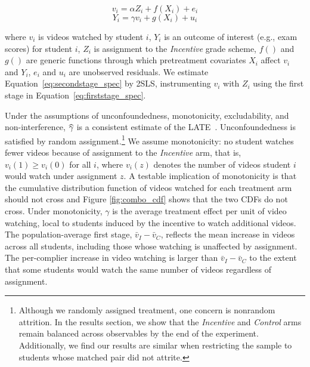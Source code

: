 \begin{equation} \label{eq:firststage_spec}
	v_i = \alpha Z_i + f(X_i) + e_i
\end{equation}
\begin{equation} \label{eq:secondstage_spec}
	Y_i = \gamma v_i + g(X_i) + u_i
\end{equation}

where $v_i$ is videos watched by student $i$, $Y_i$ is an outcome of interest (e.g., exam scores) for student $i$, $Z_i$ is assignment to the \textit{Incentive} grade scheme, $f()$ and $g()$ are generic functions through which pretreatment covariates $X_i$ affect $v_i$ and $Y_i$, $e_i$ and $u_i$ are unobserved residuals.
We estimate Equation~\ref{eq:secondstage_spec} by 2SLS, instrumenting $v_i$ with $Z_i$ using the first stage in Equation~\ref{eq:firststage_spec}.

Under the assumptions of unconfoundedness, monotonicity, excludability, and non-interference, $\wh{\gamma}$ is a consistent estimate of the LATE~\parencite{ai1995}.
Unconfoundedness is satisfied by random assignment.\footnote{Although we randomly assigned treatment, one concern is nonrandom attrition.
    In the results section, we show that the \textit{Incentive} and \textit{Control} arms remain balanced across observables by the end of the experiment.
	Additionally, we find our results are similar when restricting the sample to students whose matched pair did not attrite.
}
We assume monotonicity: no student watches fewer videos because of assignment to the \textit{Incentive} arm, that is, $v_i(1) \geq v_i(0)$ for all $i$, where $v_i(z)$ denotes the number of videos student $i$ would watch under assignment $z$.
A testable implication of monotonicity is that the cumulative distribution function of videos watched for each treatment arm should not cross and Figure \ref{fig:combo_cdf} shows that the two CDFs do not cross.
Under monotonicity, $\gamma$ is the average treatment effect per unit of video watching, local to students induced by the incentive to watch additional videos.
The population-average first stage, $\bar{v}_I - \bar{v}_C$, reflects the mean increase in videos across all students, including those whose watching is unaffected by assignment.
The per-complier increase in video watching is larger than $\bar{v}_I - \bar{v}_C$ to the extent that some students would watch the same number of videos regardless of assignment.


